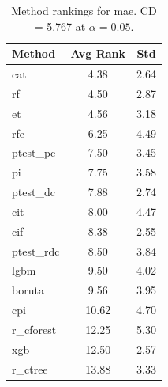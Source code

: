 \begin{table}[h]
\centering
\caption{Method rankings for mae. CD = 5.767 at $\alpha=0.05$.}
\label{tab:ranks_mae}
\begin{tabular}{lcc}
\toprule
Method & Avg Rank & Std \\
\midrule
cat & 4.38 & 2.64 \\
rf & 4.50 & 2.87 \\
et & 4.56 & 3.18 \\
rfe & 6.25 & 4.49 \\
ptest_pc & 7.50 & 3.45 \\
pi & 7.75 & 3.58 \\
ptest_dc & 7.88 & 2.74 \\
cit & 8.00 & 4.47 \\
cif & 8.38 & 2.55 \\
ptest_rdc & 8.50 & 3.84 \\
lgbm & 9.50 & 4.02 \\
boruta & 9.56 & 3.95 \\
cpi & 10.62 & 4.70 \\
r_cforest & 12.25 & 5.30 \\
xgb & 12.50 & 2.57 \\
r_ctree & 13.88 & 3.33 \\
\bottomrule
\end{tabular}
\end{table}